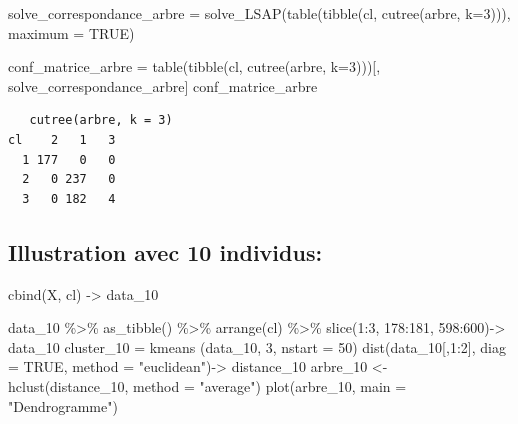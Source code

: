 \documentclass{article}
\newenvironment{Shaded}{\begin{snugshade}}{\end{snugshade}}
\newcommand{\AttributeTok}[1]{\textcolor[rgb]{0.40,0.45,0.13}{#1}}
\newcommand{\ConstantTok}[1]{\textcolor[rgb]{0.56,0.35,0.01}{#1}}
\newcommand{\DecValTok}[1]{\textcolor[rgb]{0.68,0.00,0.00}{#1}}
\newcommand{\FunctionTok}[1]{\textcolor[rgb]{0.28,0.35,0.67}{#1}}
\newcommand{\NormalTok}[1]{\textcolor[rgb]{0.00,0.23,0.31}{#1}}
\newcommand{\OtherTok}[1]{\textcolor[rgb]{0.00,0.23,0.31}{#1}}
\newcommand{\SpecialCharTok}[1]{\textcolor[rgb]{0.37,0.37,0.37}{#1}}
\newcommand{\StringTok}[1]{\textcolor[rgb]{0.13,0.47,0.30}{#1}}
\begin{document}
\begin{Shaded}
\begin{Highlighting}[]
\NormalTok{solve\_correspondance\_arbre }\OtherTok{=} \FunctionTok{solve\_LSAP}\NormalTok{(}\FunctionTok{table}\NormalTok{(}\FunctionTok{tibble}\NormalTok{(cl, }\FunctionTok{cutree}\NormalTok{(arbre, }\AttributeTok{k=}\DecValTok{3}\NormalTok{))), }\AttributeTok{maximum =} \ConstantTok{TRUE}\NormalTok{)}

\NormalTok{conf\_matrice\_arbre }\OtherTok{=} \FunctionTok{table}\NormalTok{(}\FunctionTok{tibble}\NormalTok{(cl, }\FunctionTok{cutree}\NormalTok{(arbre, }\AttributeTok{k=}\DecValTok{3}\NormalTok{)))[, solve\_correspondance\_arbre]}
\NormalTok{conf\_matrice\_arbre}
\end{Highlighting}
\end{Shaded}

\begin{verbatim}
   cutree(arbre, k = 3)
cl    2   1   3
  1 177   0   0
  2   0 237   0
  3   0 182   4
\end{verbatim}

\subsection{Illustration avec 10
individus:}\label{illustration-avec-10-individus}

\begin{Shaded}
\begin{Highlighting}[]
\FunctionTok{cbind}\NormalTok{(X, cl) }\OtherTok{{-}\textgreater{}}\NormalTok{ data\_10}

\NormalTok{data\_10 }\SpecialCharTok{\%\textgreater{}\%} \FunctionTok{as\_tibble}\NormalTok{() }\SpecialCharTok{\%\textgreater{}\%} \FunctionTok{arrange}\NormalTok{(cl) }\SpecialCharTok{\%\textgreater{}\%} \FunctionTok{slice}\NormalTok{(}\DecValTok{1}\SpecialCharTok{:}\DecValTok{3}\NormalTok{, }\DecValTok{178}\SpecialCharTok{:}\DecValTok{181}\NormalTok{, }\DecValTok{598}\SpecialCharTok{:}\DecValTok{600}\NormalTok{)}\OtherTok{{-}\textgreater{}}\NormalTok{ data\_10}
\NormalTok{cluster\_10 }\OtherTok{=} \FunctionTok{kmeans}\NormalTok{ (data\_10, }\DecValTok{3}\NormalTok{, }\AttributeTok{nstart =} \DecValTok{50}\NormalTok{)}
\FunctionTok{dist}\NormalTok{(data\_10[,}\DecValTok{1}\SpecialCharTok{:}\DecValTok{2}\NormalTok{], }\AttributeTok{diag =} \ConstantTok{TRUE}\NormalTok{, }\AttributeTok{method =} \StringTok{"euclidean"}\NormalTok{)}\OtherTok{{-}\textgreater{}}\NormalTok{ distance\_10}
\NormalTok{arbre\_10 }\OtherTok{\textless{}{-}} \FunctionTok{hclust}\NormalTok{(distance\_10, }\AttributeTok{method =} \StringTok{"average"}\NormalTok{)}
\FunctionTok{plot}\NormalTok{(arbre\_10, }\AttributeTok{main =} \StringTok{"Dendrogramme"}\NormalTok{)}
\end{Highlighting}
\end{Shaded}
\end{document}
